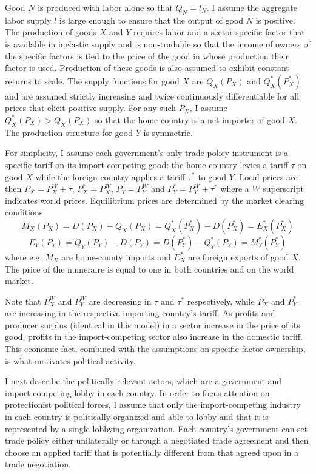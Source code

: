 \documentclass[12pt,titlepage]{article}
\begin{document}
Good $N$ is produced with labor alone so that $Q_N = l_N$. I assume the aggregate labor supply $l$ is large enough to ensure that the output of good $N$ is positive. The production of goods $X$ and $Y$ requires labor and a sector-specific factor that is available in inelastic supply and is non-tradable so that the income of owners of the specific factors is tied to the price of the good in whose production their factor is used. Production of these goods is also assumed to exhibit constant returns to scale. The supply functions for good $X$ are $Q_X(P_X)$ and $Q_X^*(P_X^*)$ and are assumed strictly increasing and twice continuously differentiable for all prices that elicit positive supply. For any such $P_X$, I assume $Q_X^*(P_X) > Q_X(P_X)$ so that the home country is a net importer of good $X$. The production structure for good $Y$ is symmetric. 

For simplicity, I assume each government's only trade policy instrument is a specific tariff on its import-competing good: the home country levies a tariff $\tau$ on good $X$ while the foreign country applies a tariff $\tau^*$ to good $Y$. Local prices are then $P_X = P_X^W + \tau$, $P_X^* = P_X^W$, $P_Y = P_Y^W$ and $P_Y^* = P_Y^W + \tau^*$ where a $W$ superscript indicates world prices. Equilibrium prices are determined by the market clearing conditions
$$M_X(P_X)= D(P_X)-Q_X(P_X) = Q_X^*(P_X^*) - D(P_X^*) = E_X^*(P_X^*)$$
$$E_Y(P_Y)=Q_Y(P_Y)-D(P_Y) = D(P_Y^*)-Q_Y^*(P_Y) = M_Y^*(P_Y^*)$$
where e.g. $M_X$ are home-county imports and $E_X^*$ are foreign exports of good $X$. The price of the numeraire is equal to one in both countries and on the world market.

Note that $P_X^W$ and $P_Y^W$ are decreasing in $\tau$ and $\tau^*$ respectively, while $P_X$ and $P_Y^*$ are increasing in the respective importing country's tariff. As profits and producer surplus (identical in this model) in a sector increase in the price of its good, profits in the import-competing sector also increase in the domestic tariff. This economic fact, combined with the assumptions on specific factor ownership, is what motivates political activity.

I next describe the politically-relevant actors, which are a government and import-competing lobby in each country. In order to focus attention on protectionist political forces, I assume that only the import-competing industry in each country is politically-organized and able to lobby and that it is represented by a single lobbying organization. Each country's government can set trade policy either unilaterally or through a negotiated trade agreement and then choose an applied tariff that is potentially different from that agreed upon in a trade negotiation.
\end{document}
